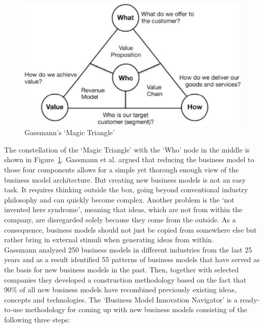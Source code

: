 		\begin{figure}[!htb]
		    \begin{center}
		    \includegraphics[scale=1.25]{Talk11/gassmann_triangle.pdf}
		    \end{center}
		    \caption{Gassmann's `Magic Triangle' \cite{gassmann55}}
		    \label{fig:m_triangle}
		\end{figure}
		The constellation of the `Magic Triangle' with the `Who' node in the middle is shown in Figure~\ref{fig:m_triangle}. Gassmann et al. argued that reducing the business model to those four components allows for a simple yet thorough enough view of the business model architecture. But creating new business models is not an easy task. It requires thinking outside the box, going beyond conventional industry philosophy and can quickly become complex. Another problem is the `not invented here syndrome', meaning that ideas, which are not from within the company, are disregarded solely because they come from the outside. As a consequence, business models should not just be copied from somewhere else but rather bring in external stimuli when generating ideas from within.\\
		Gassmann analyzed 250 business models in different industries from the last 25 years and as a result identified 55 patterns of business models that have served as the basis for new business models in the past. Then, together with selected companies they developed a construction methodology based on the fact that 90\% of all new business models have recombined previously existing ideas, concepts and  technologies. The `Business Model Innovation Navigator' is a ready-to-use methodology for coming up with new business models consisting of the following three steps:
		\vspace{-1em}
